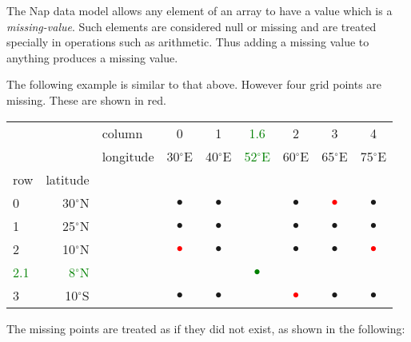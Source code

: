 The Nap data model allows any element of an array to have a
  value which is a 
  \textit{missing-value}. Such elements are considered null or missing
  and are treated specially in operations such as arithmetic. Thus
  adding a missing value to anything produces a missing value.

The following example is similar to that above. However four grid
  points are missing. These are shown in red.

    \begin{tabular}{|lrl|cccccc|}
      \hline 
         & 
         & 
        column & 
        0 & 
        1 & 
	\textcolor{green}{1.6}
         & 
        2 & 
        3 & 
        4
      \\
         & 
         & 
        longitude & 
        30$^{\circ}$E & 
        40$^{\circ}$E & 
	\textcolor{green}{52$^{\circ}$E}
         & 
        60$^{\circ}$E & 
        65$^{\circ}$E & 
        75$^{\circ}$E
      \\
        row & 
        latitude
         & 
         & 
         & 
         & 
         & 
         & 
         & 
      \\
      \hline 
        0 & 
        30$^{\circ}$N & 
         & 
        $\bullet$ & 
        $\bullet$ & 
         & 
        $\bullet$ & 
	\textcolor{red}{$\bullet$} & 
        $\bullet$
      \\
        1 & 
        25$^{\circ}$N & 
         & 
        $\bullet$ & 
        $\bullet$ & 
         & 
        $\bullet$ & 
        $\bullet$ & 
        $\bullet$ 
      \\
        2 & 
        10$^{\circ}$N & 
         & 
	\textcolor{red}{$\bullet$}
         & 
        $\bullet$ & 
         & 
        $\bullet$ & 
        $\bullet$ & 
	\textcolor{red}{$\bullet$}
      \\
	\textcolor{green}{2.1}
         & 
	\textcolor{green}{8$^{\circ}$N}
         & 
         & 
         & 
         & 
\textcolor{green}{$\bullet$}
         & 
         & 
         & 
      \\
        3 & 
        10$^{\circ}$S & 
         & 
        $\bullet$ & 
        $\bullet$ & 
         & 
	\textcolor{red}{$\bullet$}
         & 
        $\bullet$ & 
        $\bullet$
      \\
      \hline 
\end{tabular}

  The missing points are treated as if they did not exist, as shown
  in the following:

